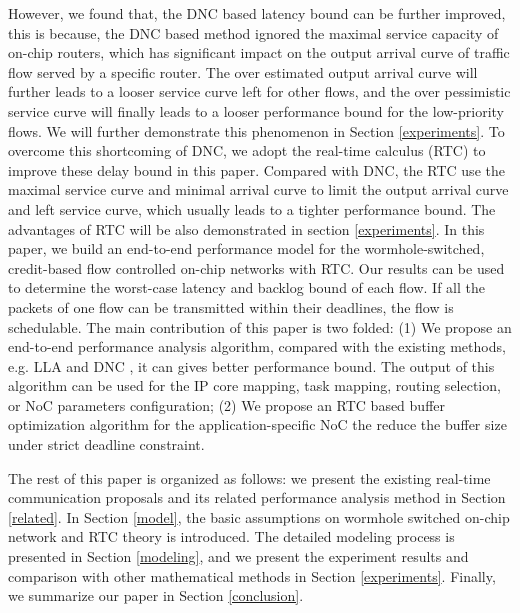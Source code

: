 \documentclass[10pt,journal]{IEEEtran}
\begin{document}
However, we found that, the DNC based latency bound can be further improved, this is because, the DNC based method \cite{Qian489900} ignored the maximal service capacity of on-chip routers, which has significant impact on the output arrival curve of traffic flow served by a specific router. The over estimated output arrival curve will further leads to a looser service curve left for other flows, and the over pessimistic service curve will finally leads to a looser performance bound for the low-priority flows. We will further demonstrate this phenomenon in Section \ref{experiments}. To overcome this shortcoming of DNC, we adopt the real-time calculus (RTC) to improve these delay bound in this paper. Compared with DNC, the RTC use the maximal service curve and minimal arrival curve to limit the output arrival curve and left service curve, which usually leads to a tighter performance bound. The advantages of RTC will be also demonstrated in section \ref{experiments}. In this paper, we build an end-to-end performance model for the wormhole-switched, credit-based flow controlled on-chip networks with RTC. Our results can be used to determine the worst-case latency and backlog bound of each flow. If all the packets of one flow can be transmitted within their deadlines, the flow is schedulable. The main contribution of this paper is two folded: (1) We propose an end-to-end performance analysis algorithm, compared with the existing methods, e.g. LLA \cite{73}\cite{189} and DNC \cite{Qian489900}, it can gives better performance bound. The output of this algorithm can be used for the IP core mapping, task mapping, routing selection, or NoC parameters configuration; (2) We propose an RTC based buffer optimization algorithm for the application-specific NoC the reduce the buffer size under strict deadline constraint.

The rest of this paper is organized as follows: we present the existing real-time communication proposals and its related performance analysis method in Section \ref{related}. In Section \ref{model}, the basic assumptions on wormhole switched on-chip network and RTC theory is introduced. The detailed modeling process is presented in Section \ref{modeling}, and we present the experiment results and comparison with other mathematical methods in Section \ref{experiments}. Finally, we summarize our paper in Section \ref{conclusion}.
\end{document}

